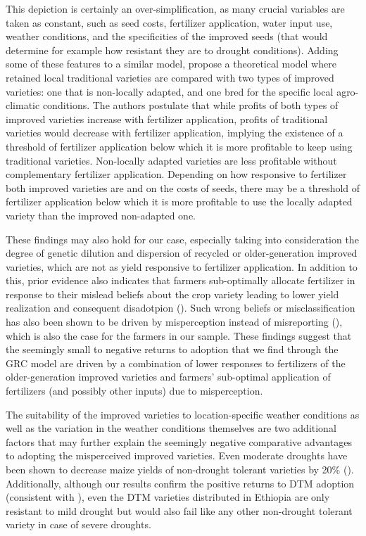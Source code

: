 \documentclass[11pt]{article}
\begin{document}
This depiction is certainly an over-simplification, as many crucial variables are taken as constant, such as seed costs, fertilizer application, water input use, weather conditions, and the specificities of the improved seeds (that would determine for example how resistant they are to drought conditions). Adding some of these features to a similar model, \cite{Bird2020-nt} propose a theoretical model where retained local traditional varieties are compared with two types of improved varieties: one that is non-locally adapted, and one bred for the specific local agro-climatic conditions. The authors postulate that while profits of both types of improved varieties increase with fertilizer application, profits of traditional varieties would decrease with fertilizer application, implying the existence of a threshold of fertilizer application below which it is more profitable to keep using traditional varieties. Non-locally adapted varieties are less profitable without complementary fertilizer application. Depending on how responsive to fertilizer both improved varieties are and on the costs of seeds, there may be a threshold of fertilizer application below which it is more profitable to use the locally adapted variety than the improved non-adapted one.

These findings may also hold for our case, especially taking into consideration the degree of genetic dilution and dispersion of recycled or older-generation improved varieties, which are not as yield responsive to fertilizer application. In addition to this, prior evidence also indicates that farmers sub-optimally allocate fertilizer in response to their mislead beliefs about the crop variety leading to lower yield realization and consequent disadotpion  (\citealt{euler2022because}). Such wrong beliefs or misclassification has also been shown to be driven by misperception instead of misreporting (\citealt{wossen2022misperceiving}), which is also the case for the farmers in our sample. These findings suggest that the seemingly small to negative returns to adoption that we find through the GRC model are driven by a combination of lower responses to fertilizers of the older-generation improved varieties and farmers’ sub-optimal application of fertilizers (and possibly other inputs) due to misperception.

The suitability of the improved varieties to location-specific weather conditions as well as the variation in the weather conditions themselves are two additional factors that may further explain the seemingly negative comparative advantages to adopting the misperceived improved varieties. Even moderate droughts have been shown to decrease maize yields of non-drought tolerant varieties by 20\% (\citealt{paul2021heterogeneous}). Additionally, although our results confirm the positive returns to DTM adoption (consistent with \citealt{wossen2017measuring}), even the DTM varieties distributed in Ethiopia are only resistant to mild drought but would also fail like any other non-drought tolerant variety in case of severe droughts. 
\end{document}
